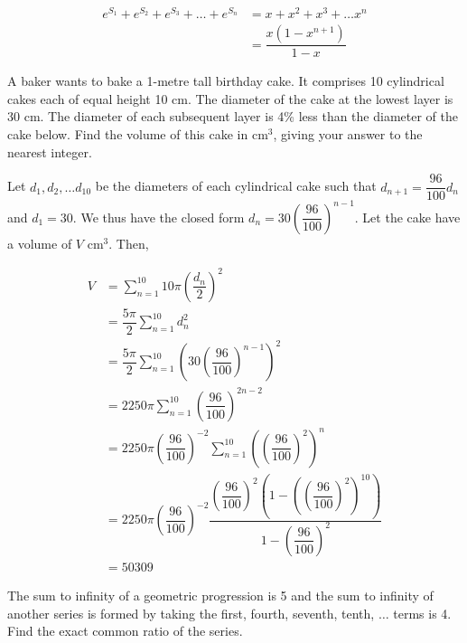 \documentclass{echw}
\begin{document}
        \begin{equation*}
            \begin{aligned}
                e^{S_1} + e^{S_2} + e^{S_3} + \ldots + e^{S_n} &= x + x^2 + x^3 + \ldots x^n\\
                &= \dfrac{x(1-x^{n+1})}{1-x}
            \end{aligned}
        \end{equation*}


    \problem{}
        A baker wants to bake a 1-metre tall birthday cake. It comprises 10 cylindrical cakes each of equal height 10 cm. The diameter of the cake at the lowest layer is 30 cm. The diameter of each subsequent layer is 4\% less than the diameter of the cake below. Find the volume of this cake in cm$^3$, giving your answer to the nearest integer.

    \solution
        Let $d_1, d_2, \ldots d_{10}$ be the diameters of each cylindrical cake such that $d_{n+1} = \dfrac{96}{100}d_n$ and $d_1 = 30$. We thus have the closed form $d_n = 30\left(\dfrac{96}{100}\right)^{n-1}$. Let the cake have a volume of $V$ cm$^3$. Then,

        \begin{equation*}
            \begin{aligned}
                V &= \sum_{n=1}^{10} 10\pi \left(\dfrac{d_n}2\right)^2 \\
                &= \dfrac{5\pi}2 \sum_{n=1}^{10} d^2_n \\
                &= \dfrac{5\pi}2 \sum_{n=1}^{10} \left(30\left(\dfrac{96}{100}\right)^{n-1}\right)^2\\
                &= 2250\pi \sum_{n=1}^{10} \left(\dfrac{96}{100}\right)^{2n-2}\\
                &= 2250\pi \left(\dfrac{96}{100}\right)^{-2} \sum_{n=1}^{10} \left(\left(\dfrac{96}{100}\right)^2\right)^{n}\\
                &= 2250\pi \left(\dfrac{96}{100}\right)^{-2} \dfrac{\left(\dfrac{96}{100}\right)^2 \left(1 - \left(\left(\dfrac{96}{100}\right)^2\right)^{10}\right)}{1-\left(\dfrac{96}{100}\right)^2}\\
                &= 50309
            \end{aligned}
        \end{equation*}

    \problem{}
        The sum to infinity of a geometric progression is 5 and the sum to infinity of another series is formed by taking the first, fourth, seventh, tenth, $\ldots$ terms is 4. Find the exact common ratio of the series.
\end{document}
